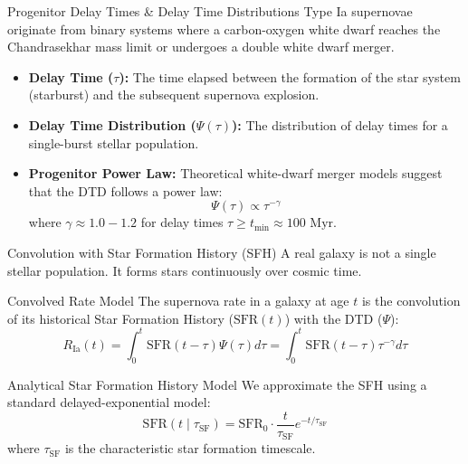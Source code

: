 \documentclass[9pt]{beamer}
\begin{document}
\begin{frame}{Progenitor Delay Times \& Delay Time Distributions}
  Type Ia supernovae originate from binary systems where a carbon-oxygen white dwarf reaches the Chandrasekhar mass limit or undergoes a double white dwarf merger.
  \begin{itemize}
    \item \textbf{Delay Time ($\tau$):} The time elapsed between the formation of the star system (starburst) and the subsequent supernova explosion.
    \item \textbf{Delay Time Distribution ($\Psi(\tau)$):} The distribution of delay times for a single-burst stellar population.
    \item \textbf{Progenitor Power Law:} Theoretical white-dwarf merger models suggest that the DTD follows a power law:
      $$\Psi(\tau) \propto \tau^{-\gamma}$$
      where $\gamma \approx 1.0 - 1.2$ for delay times $\tau \ge t_{\text{min}} \approx 100\text{ Myr}$.
  \end{itemize}
\end{frame}

\begin{frame}{Convolution with Star Formation History (SFH)}
  A real galaxy is not a single stellar population. It forms stars continuously over cosmic time.
  \begin{block}{Convolved Rate Model}
    The supernova rate in a galaxy at age $t$ is the convolution of its historical Star Formation History ($\text{SFR}(t)$) with the DTD ($\Psi$):
    $$R_{\text{Ia}}(t) = \int_0^t \text{SFR}(t - \tau) \Psi(\tau) d\tau = \int_0^t \text{SFR}(t - \tau) \tau^{-\gamma} d\tau$$
  \end{block}
  \begin{block}{Analytical Star Formation History Model}
    We approximate the SFH using a standard delayed-exponential model:
    $$\text{SFR}(t \mid \tau_{\text{SF}}) = \text{SFR}_0 \cdot \frac{t}{\tau_{\text{SF}}} e^{-t/\tau_{\text{SF}}}$$
    where $\tau_{\text{SF}}$ is the characteristic star formation timescale.
  \end{block}
\end{frame}
\end{document}
